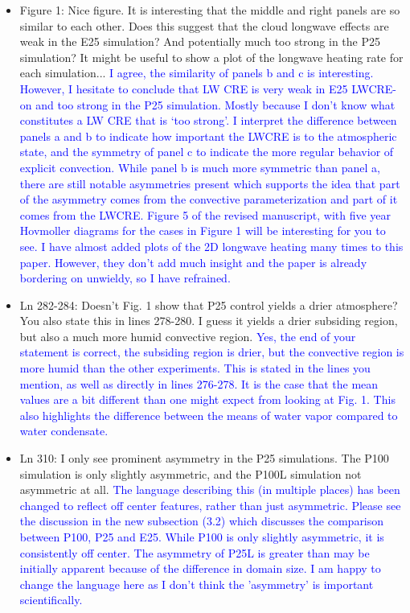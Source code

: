 \documentclass[draft]{agujournal2019}
\begin{document}
\begin{itemize}
  \item Figure 1: Nice figure. It is interesting that the middle and right panels are so similar to each other. Does this suggest that the cloud longwave effects are weak in the E25 simulation? And potentially much too strong in the P25 simulation? It might be useful to show a plot of the longwave heating rate for each simulation...  
  \textcolor{blue}{I agree, the similarity of panels b and c is interesting.  However, I hesitate to conclude that LW CRE is very weak in E25 LWCRE-on and 
  too strong in the P25 simulation.  Mostly because I don't know what constitutes a LW CRE that is `too strong'.  I interpret the difference between panels
  a and b to indicate how important the LWCRE is to the atmospheric state, and the symmetry of panel c to indicate the more regular behavior of explicit convection.
  While panel b is much more symmetric than panel a, there are still notable asymmetries present which supports the idea that part of the asymmetry comes from the convective parameterization and part of it comes from the LWCRE.  Figure 5 of the revised manuscript, with five year Hovmoller diagrams for the cases in Figure 1 will be interesting for you to see.  I have almost added plots of the 2D longwave heating many times to this paper.  However, they don't add much insight and the paper is already bordering on unwieldy, so I have refrained.}
  
  \item Ln 282-284:  Doesn't Fig. 1 show that P25 control yields a drier atmosphere? You also state this in lines 278-280. I guess it yields a drier subsiding region, but also a much more humid convective region. 
  \textcolor{blue}{Yes, the end of your statement is correct, the subsiding region is drier, but the convective region is more humid than the other experiments.  This is stated in the lines you mention, as well as directly in lines 276-278.  It is the case that the mean values are a bit different than one might expect from looking at Fig. 1.  This also highlights the difference between the means of water vapor compared to water condensate.}
  
  \item Ln 310: I only see prominent asymmetry in the P25 simulations. The P100 simulation is only slightly asymmetric, and the P100L simulation not asymmetric at all.
  \textcolor{blue}{The language describing this (in multiple places) has been changed to reflect off center features, rather than just asymmetric.  Please see the discussion in 
  the new subsection (3.2) which discusses the comparison between P100, P25 and E25.   While P100 is only slightly asymmetric, it is 
  consistently off center.  The asymmetry of P25L is greater than may be initially apparent because of the difference in domain size.  I am happy to change 
  the language here as I don't think the 'asymmetry' is important scientifically.}
  

\end{itemize}
\end{document}
